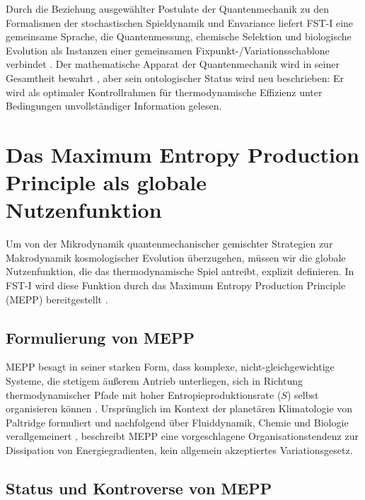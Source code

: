 \documentclass[12pt,a4paper]{article}
\theoremstyle{remark}
\begin{document}
Durch die Beziehung ausgew\"ahlter Postulate der Quantenmechanik zu den Formalismen der stochastischen Spieldynamik und Envariance liefert FST-I eine gemeinsame Sprache, die Quantenmessung, chemische Selektion und biologische Evolution als Instanzen einer gemeinsamen Fixpunkt-/Variationsschablone verbindet \citep{SchlossFine2005}. Der mathematische Apparat der Quantenmechanik wird in seiner Gesamtheit bewahrt \citep{QuantumOptimization}, aber sein ontologischer Status wird neu beschrieben: Er wird als optimaler Kontrollrahmen f\"ur thermodynamische Effizienz unter Bedingungen unvollst\"andiger Information gelesen.

\section{Das Maximum Entropy Production Principle als globale Nutzenfunktion}
\label{sec:mepp}

Um von der Mikrodynamik quantenmechanischer gemischter Strategien zur Makrodynamik kosmologischer Evolution \"uberzugehen, m\"ussen wir die globale Nutzenfunktion, die das thermodynamische Spiel antreibt, explizit definieren. In FST-I wird diese Funktion durch das Maximum Entropy Production Principle (MEPP) bereitgestellt \citep{MEPP2004}.

\subsection{Formulierung von MEPP}

MEPP besagt in seiner starken Form, dass komplexe, nicht-gleichgewichtige Systeme, die stetigem \"au\ss{}erem Antrieb unterliegen, sich in Richtung thermodynamischer Pfade mit hoher Entropieproduktionsrate ($\dot{S}$) selbst organisieren k\"onnen \citep{MEPPFoundations}. Urspr\"unglich im Kontext der planet\"aren Klimatologie von Paltridge \citep{Paltridge1975} formuliert und nachfolgend \"uber Fluiddynamik, Chemie und Biologie verallgemeinert \citep{MEPP2004}, beschreibt MEPP eine vorgeschlagene Organisationstendenz zur Dissipation von Energiegradienten, kein allgemein akzeptiertes Variationsgesetz.

\subsection{Status und Kontroverse von MEPP}
\end{document}
